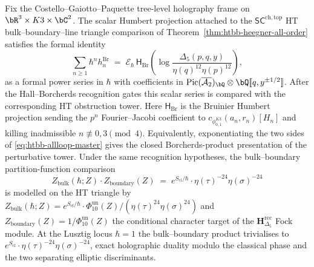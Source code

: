 \begin{theorem}
\label{thm:htbb-allloop-resummation}
Fix the Costello--Gaiotto--Paquette tree-level holography frame on
$\bR^3\times K3\times\bC^2$. The scalar Humbert projection attached to
the $\mathsf{SC}^{\mathrm{ch,top}}$ HT bulk--boundary--line triangle
comparison of
Theorem~\ref{thm:htbb-heegner-all-order} satisfies the formal identity
\begin{equation}\label{eq:htbb-allloop-master}
 \sum_{n\geq 1}\hbar^n h_n^{\mathrm{Br}}
 \;=\;
 \mathscr E_\hbar\,\mathsf H_{\mathrm{Br}}\!
	 \left(\log\frac{\Delta_5(p,q,y)}{\eta(q)^{12}\eta(p)^{12}}\right),
\end{equation}
as a formal power series in $\hbar$ with coefficients in
$\mathrm{Pic}(\overline{\mathcal A_2})_\bQ\otimes\bQ[\![q, y^{\pm 1/2}]\!]$.
After the Hall--Borcherds recognition gates this scalar series is
compared with the corresponding HT obstruction tower. Here
$\mathsf H_{\mathrm{Br}}$ is the Bruinier Humbert projection sending
the $p^n$ Fourier--Jacobi coefficient to
	\(c_{\phi_{0,1}^{K3}}(a_n,r_n)[H_n]\) and killing inadmissible
$n\not\equiv0,3\pmod4$. Equivalently, exponentiating the two sides of
\eqref{eq:htbb-allloop-master} gives the closed Borcherds-product
presentation of the perturbative tower. Under the same recognition
hypotheses, the bulk--boundary partition-function comparison
\begin{equation}\label{eq:htbb-allloop-bulk-boundary}
 Z_{\mathrm{bulk}}(\hbar; Z) \cdot Z_{\mathrm{boundary}}(Z)
 \;=\; e^{S_{\mathrm{cl}}/\hbar}\cdot
 \eta(\tau)^{-24}\eta(\sigma)^{-24}
\end{equation}
is modelled on the HT triangle by $Z_{\mathrm{bulk}}(\hbar; Z) =
e^{S_{\mathrm{cl}}/\hbar}\cdot
\Phi_{10}^{\mathrm{un}}(Z)/(\eta(\tau)^{24}\eta(\sigma)^{24})$ and
$Z_{\mathrm{boundary}}(Z) = 1/\Phi_{10}^{\mathrm{un}}(Z)$ the
conditional character target of the
$\mathbf{H}_{\Delta_5}^{\mathrm{rec}}$ Fock module. At the Lusztig locus
$\hbar = 1$ the bulk--boundary product trivialises to
$e^{S_{\mathrm{cl}}}\cdot\eta(\tau)^{-24}\eta(\sigma)^{-24}$, exact holographic duality
modulo the classical phase and the two separating elliptic discriminants.
\end{theorem}

